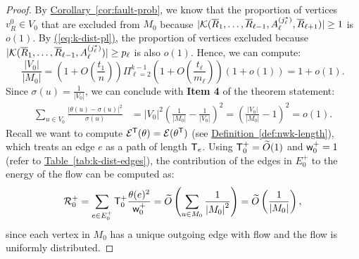 \documentclass{theoretics}
\newcommand{\eq}[1]{\hyperref[eq:#1]{(\ref*{eq:#1})}}
\newcommand{\cor}[1]{\hyperref[cor:#1]{Corollary~\ref*{cor:#1}}}
\newcommand{\tabl}[1]{\hyperref[tab:#1]{Table~\ref*{tab:#1}}}
\newcommand{\defin}[1]{\hyperref[def:#1]{Definition~\ref*{def:#1}}}
\renewcommand{\>}{\rangle}
\newcommand{\<}{\langle}
\renewcommand{\(}{\left(}
\renewcommand{\)}{\right)}
\def\abs#1{\left| #1 \right|}
\def\w{{\sf w}}
\begin{document}
\begin{proof}
		By \cor{fault-prob}, we know that the proportion of vertices $v_R^0\in V_0$ that are excluded from $M_0$ because 
		$|{\cal K}(\overline{R}_1,\dots,\overline{R}_{\ell-1},A_{\ell}^{(j_{\ell}^*)},\overline{R}_{\ell+1})| \geq 1$ is $o(1)$. 
By \eq{k-dist-pl}, the proportion of vertices excluded because $|{\cal K}(\overline{R}_1,\dots,\overline{R}_{\ell-1},A_{\ell}^{(j_{\ell}^*)})|\geq p_{\ell}$ is also $o(1)$. 
Hence, we can compute:
		\begin{equation*}
			\frac{\abs{V_0}}{\abs{M_0}} = \left(1+O\left(\frac{t_1}{n}\right)\right)\Pi_{\ell=2}^{k-1}\left(1+O\left(\frac{t_\ell}{m_\ell}\right)\right)\left(1 + o(1)\right) = 1+o(1).
		\end{equation*}
		Since $\sigma(u)=\frac{1}{\abs{V_0}}$, we can conclude with \textbf{Item 4} of the theorem statement:
		\begin{equation*}
			\begin{split}
				\sum_{u\in V_0}\frac{|\theta(u)-\sigma(u)|^2}{\sigma(u)} 
				&= \abs{V_0}^2\left(\frac{1}{\abs{M_0}}-\frac{1}{\abs{V_0}}\right)^2
				= \left(\frac{\abs{V_0}}{\abs{M_0}}-1\right)^2=o(1).
			\end{split}
		\end{equation*}
Recall we want to compute ${\cal E}^{\sf T}(\theta)={\cal E}(\theta^{\sf T})$ (see \defin{nwk-length}), which treats an edge $e$ as a path of length ${\sf T}_{e}$.
Using ${\sf T}_0^+=\widetilde{O}(1)$ and $\w_0^+=1$ (refer to \tabl{k-dist-edges}), the contribution of the edges in $E_0^{+}$ to the energy of the flow can be computed as:
		\begin{equation}
			{\cal R}_0^+ = \sum_{e\in E_0^+}{\sf T}_0^+\frac{\theta(e)^2}{\w_0^+} = \widetilde{O}\left(\sum_{u\in M_0}\frac{1}{\abs{M_0}^2}\right)=\widetilde{O}\left(\frac{1}{\abs{M_0}}\right),\label{eq:k-R0+}
		\end{equation}
		since each vertex in $M_0$ has a unique outgoing edge with flow and the flow is uniformly distributed.


\end{proof}
\end{document}

